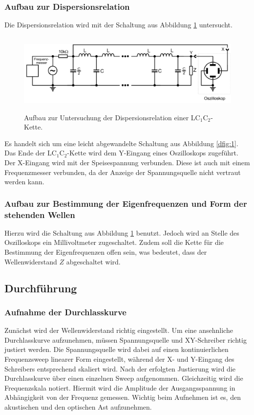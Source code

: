 \subsubsection{Aufbau zur Dispersionsrelation}
Die Dispersionsrelation wird mit der Schaltung aus Abbildung \ref{dfig:2} untersucht.

\begin{figure}[H]
  \centering
  \includegraphics[height=4cm]{dispersion.png}
  \caption{Aufbau zur Untersuchung der Dispersionsrelation einer LC$_1$C$_2$-Kette. \cite{sample}}
  \label{dfig:2}
\end{figure}

Es handelt sich um eine leicht abgewandelte Schaltung aus Abbildung \ref{dfig:1}.
Das Ende der LC$_1$C$_2$-Kette wird dem Y-Eingang eines Oszilloskops zugeführt.
Der X-Eingang wird mit der Speisespannung verbunden.
Diese ist auch mit einem Frequenzmesser verbunden, da der Anzeige der Spannungsquelle nicht vertraut werden kann.

\subsubsection{Aufbau zur Bestimmung der Eigenfrequenzen und Form der stehenden Wellen}
Hierzu wird die Schaltung aus Abbildung \ref{dfig:2} benutzt.
Jedoch wird an Stelle des Oszilloskops ein Millivoltmeter zugeschaltet.
Zudem soll die Kette für die Bestimmung der Eigenfrequenzen offen sein, was bedeutet, dass der Wellenwiderstand $Z$ abgeschaltet wird.

\subsection{Durchführung}
\subsubsection{Aufnahme der Durchlasskurve}
Zunächst wird der Wellenwiderstand richtig eingestellt.
Um eine ansehnliche Durchlasskurve aufzunehmen, müssen Spannungsquelle und XY-Schreiber richtig justiert werden.
Die Spannungsquelle wird dabei auf einen kontinuierlichen Frequenzsweep linearer Form eingestellt, während der X- und Y-Eingang des Schreibers entsprechend skaliert wird.
Nach der erfolgten Justierung wird die Durchlasskurve über einen einzelnen Sweep aufgenommen.
Gleichzeitig wird die Frequenzskala notiert.
Hiermit wird die Amplitude der Ausgangsspannung in Abhängigkeit von der Frequenz gemessen.
Wichtig beim Aufnehmen ist es, den akustischen und den optischen Ast aufzunehmen.

